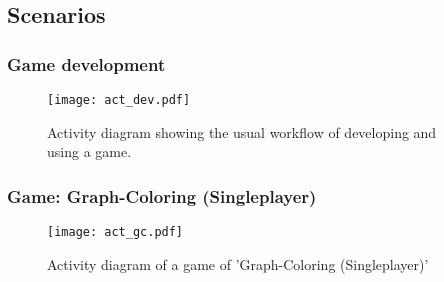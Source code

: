 \subsection{Scenarios}

\subsubsection{Game development}
\begin{figure}[h!]
	\centering
	\texttt{[image: act\_dev.pdf]}
	\caption{Activity diagram showing the usual workflow of developing and using a game.}
	\label{img:ACTDEV}
\end{figure}
\subsubsection{Game: Graph-Coloring (Singleplayer)}
\begin{figure}[h!]
	\centering
	\texttt{[image: act\_gc.pdf]}
	\caption{Activity diagram of a game of 'Graph-Coloring (Singleplayer)'}
	\label{img:ACTGC}
\end{figure}